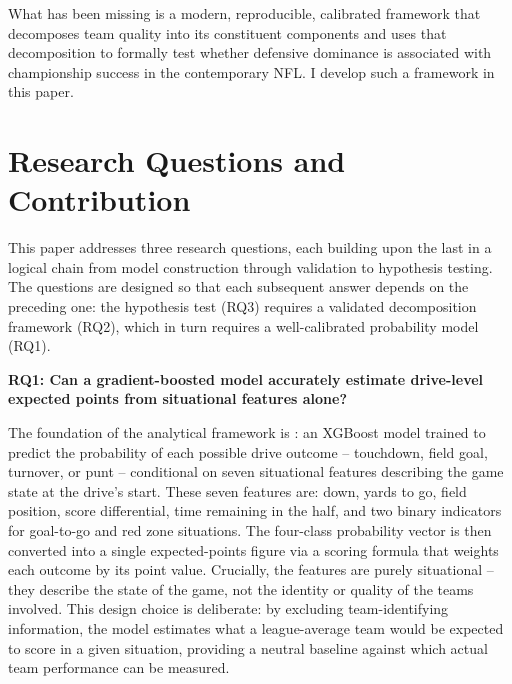 What has been missing is a modern, reproducible, calibrated framework that decomposes team quality into its constituent components and uses that decomposition to formally test whether defensive dominance is associated with championship success in the contemporary NFL. I develop such a framework in this paper.


\section{Research Questions and Contribution}
\label{sec:research-questions}

This paper addresses three research questions, each building upon the last in a logical chain from model construction through validation to hypothesis testing. The questions are designed so that each subsequent answer depends on the preceding one: the hypothesis test (RQ3) requires a validated decomposition framework (RQ2), which in turn requires a well-calibrated probability model (RQ1).

\textbf{RQ1: Can a gradient-boosted model accurately estimate drive-level expected points from situational features alone?}

The foundation of the analytical framework is \xscore{}: an XGBoost model \parencite{chen2016xgboost} trained to predict the probability of each possible drive outcome  -- touchdown, field goal, turnover, or punt  -- conditional on seven situational features describing the game state at the drive's start. These seven features are: down, yards to go, field position, score differential, time remaining in the half, and two binary indicators for goal-to-go and red zone situations. The four-class probability vector is then converted into a single expected-points figure via a scoring formula that weights each outcome by its point value. Crucially, the features are purely situational  -- they describe the state of the game, not the identity or quality of the teams involved. This design choice is deliberate: by excluding team-identifying information, the model estimates what a league-average team would be expected to score in a given situation, providing a neutral baseline against which actual team performance can be measured.

